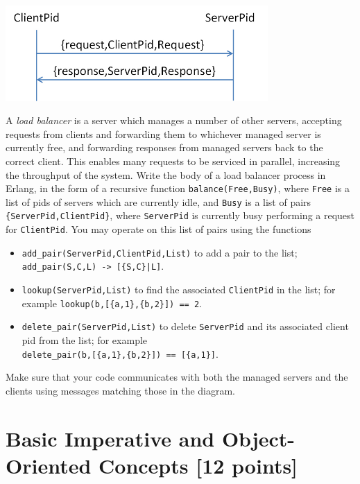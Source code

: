 \documentclass{article}
\begin{document}
\begin{enumerate}
\begin{center}
\includegraphics[width=10cm]{Diagram2.jpg}
\end{center}

A {\em load balancer} is a server which manages a number of other
servers, accepting requests from clients and forwarding them to
whichever managed server is currently free, and forwarding responses
from managed servers back to the correct client. This enables many
requests to be serviced in parallel, increasing the throughput of the
system.  Write the body of a load balancer process in Erlang, in the
form of a recursive function \verb!balance(Free,Busy)!, where
\verb!Free!  is a list of pids of servers which are currently idle,
and \verb!Busy!  is a list of pairs \verb!{ServerPid,ClientPid}!,
where \verb!ServerPid! is currently busy performing a request for
\verb!ClientPid!. You may operate on this list of pairs using the
functions
\begin{itemize}
\item
\verb!add_pair(ServerPid,ClientPid,List)! to add a pair to the list;
\verb!add_pair(S,C,L) -> [{S,C}|L]!. 
\item
\verb!lookup(ServerPid,List)! to find the associated \verb!ClientPid!
in the list; for example \verb!lookup(b,[{a,1},{b,2}]) == 2!.
\item
\verb!delete_pair(ServerPid,List)! to delete \verb!ServerPid! and its
associated client pid from the list; for example\\
\verb!delete_pair(b,[{a,1},{b,2}]) == [{a,1}]!. 
\end{itemize}
Make sure that your code communicates with both the managed servers
and the clients using messages matching those in the diagram.


\end{enumerate}

\newpage



\section{Basic Imperative and Object-Oriented Concepts [12 points]}
\lstset{language=Java, columns=flexible}
\end{document}
